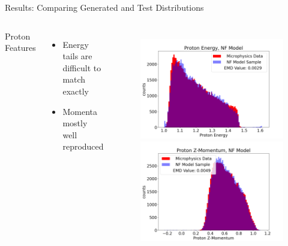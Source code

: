 \documentclass[aspectratio=169]{beamer}
\begin{document}
\begin{frame}{Results: Comparing Generated and Test Distributions}
   \begin{columns}
            Proton Features
            \begin{itemize}
                    \setlength\itemsep{0.3em}
                    \item Energy tails are difficult to match exactly
                    \item Momenta mostly well reproduced
            \end{itemize}
   
            \begin{figure}[H]
            \centering
            \includegraphics[width=.97\textwidth]{images/Features16/Proton_Energy,_NF_Model.png}
            \includegraphics[width=.97\textwidth]{images/Features16/Proton_Z-Momentum,_NF_Model.png}
            \label{fig:clas6}
            \end{figure}
            

\end{columns}
\end{frame}
\end{document}
